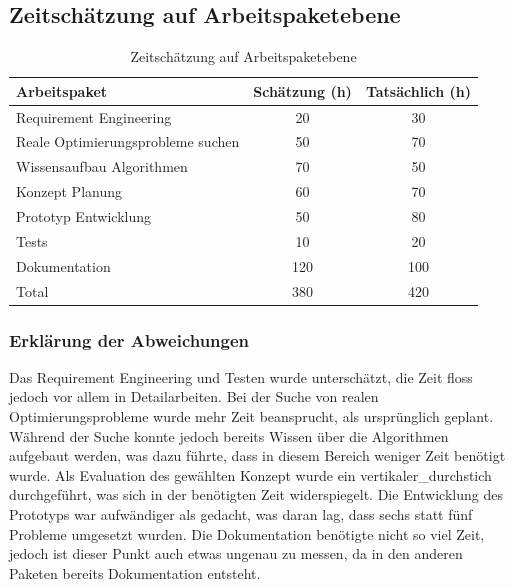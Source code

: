 \FloatBarrier
\newpage

\subsection{Zeitschätzung auf Arbeitspaketebene}
\begin{table}[ht]
\centering
  \begin{tabular}{ l | c | c }
	\hline
	\rowcolor{gray}
	\textbf{Arbeitspaket}					&	\textbf{Schätzung (h)}	& \textbf{Tatsächlich (h)}	\\ \hline
	Requirement Engineering					&	20			& 30	\\ \hline
	Reale Optimierungsprobleme suchen			&	50			& 70	\\ \hline
	Wissensaufbau Algorithmen				&	70			& 50	\\ \hline
	Konzept Planung						&	60			& 70	\\ \hline
	Prototyp Entwicklung					&	50			& 80	\\ \hline
	Tests								&	10			& 20	\\ \hline
	Dokumentation						&	120			& 100	\\ \hline \hline
	Total								&	380			& 420	\\ \hline
  \end{tabular}
   \caption{Zeitschätzung auf Arbeitspaketebene}\label{table:time_estimation}
\end{table}

\FloatBarrier

\subsubsection{Erklärung der Abweichungen}
Das Requirement Engineering und Testen wurde unterschätzt, die Zeit floss jedoch vor allem in Detailarbeiten. Bei der Suche von realen Optimierungsprobleme wurde mehr Zeit beansprucht, als
ursprünglich geplant. Während der Suche konnte jedoch bereits Wissen über die Algorithmen aufgebaut werden, was dazu führte, dass in diesem Bereich weniger Zeit benötigt wurde. Als 
Evaluation des gewählten Konzept wurde ein \gls{vertikaler_durchstich} durchgeführt, was sich in der benötigten Zeit widerspiegelt. Die Entwicklung des Prototyps war aufwändiger 
als gedacht, was daran lag, dass sechs statt fünf Probleme umgesetzt wurden. Die Dokumentation benötigte nicht so viel Zeit, jedoch ist dieser Punkt auch etwas ungenau zu 
messen, da in den anderen Paketen bereits Dokumentation entsteht.
